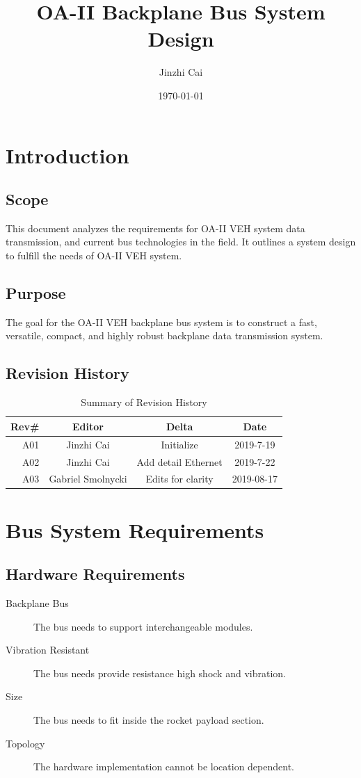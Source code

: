 \documentclass[12pt,article]{memoir}
\title{OA-II Backplane Bus System Design}
\author{Jinzhi Cai}
\date{\today}
\begin{document}
	


\tableofcontents*
\newpage



\chapter{Introduction}
\section{Scope}
This document analyzes the requirements for OA-II VEH system data transmission, and current bus technologies in the field. It outlines a system design to fulfill the needs of OA-II VEH system.
\section{Purpose}
The goal for the OA-II VEH backplane bus system is to construct a fast, versatile, compact, and highly robust backplane data transmission system.
\section{Revision History}
\begin{table}[H]
	\centering
	\begin{tabu}{r || c | c | c }
		Rev\# & Editor & Delta & Date\\ \hline
		A01 & Jinzhi Cai & Initialize & 2019-7-19\\\hline
		A02 & Jinzhi Cai & Add detail Ethernet & 2019-7-22\\
		A03 & Gabriel Smolnycki & Edits for clarity & 2019-08-17
	\end{tabu}
	\caption{Summary of Revision History}
	\label{tab:rev}
\end{table}
\newpage

\chapter{Bus System Requirements}
\section{Hardware Requirements}
\begin{description}
	\item[Backplane Bus]The bus needs to support interchangeable modules.
	\item[Vibration Resistant]The bus needs provide resistance high shock and vibration.
	\item[Size]The bus needs to fit inside the rocket payload section.
	\item[Topology]The hardware implementation cannot be location dependent.
\end{description}
\end{document}
